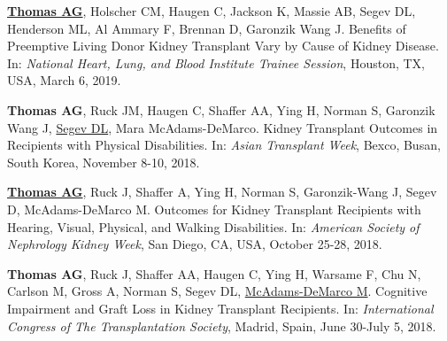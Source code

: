 \documentclass[10pt]{article}
\makeatletter
\newlength{\bibhang}
\newlength{\bibsep}
 {\@listi \global\bibsep\itemsep \global\advance\bibsep by\parsep}
\newenvironment{bibenum*}
  {\renewcommand\labelenumi{[\theenumi]}%
   \etaremune[
     topsep=0pt,
     itemsep=\bibsep,
     parsep=0pt,partopsep=0pt,
     itemindent=-\bibhang,
     leftmargin={\bibhang+\widthof{[999]}}]}
  {\endetaremune}
\makeatother
\begin{document}
\begin{bibenum*}
\item \underline{\textbf{Thomas AG}}, Holscher CM, Haugen C,
  Jackson K, Massie AB,
  Segev DL, Henderson ML, Al Ammary F, Brennan D, Garonzik Wang J.
  Benefits of Preemptive Living Donor Kidney Transplant Vary by
  Cause of Kidney Disease.
  In: \emph{National Heart, Lung, and Blood Institute Trainee Session},
  Houston, TX, USA, March 6, 2019.

\item \textbf{Thomas AG}, Ruck JM, Haugen C, Shaffer AA, Ying H,
  Norman S, Garonzik Wang J, \underline{Segev DL}, Mara McAdams-DeMarco.
  Kidney Transplant Outcomes in Recipients with Physical Disabilities.
  In: \emph{Asian Transplant Week},
  Bexco, Busan, South Korea, November 8-10, 2018.

\item \underline{\textbf{Thomas AG}}, Ruck J, Shaffer A, Ying H, Norman S,
  Garonzik-Wang J, Segev D, McAdams-DeMarco M.
  Outcomes for Kidney Transplant Recipients with Hearing, Visual, Physical,
  and Walking Disabilities.
  In: \emph{American Society of Nephrology Kidney Week},
  San Diego, CA, USA, October 25-28, 2018.


\item \textbf{Thomas AG}, Ruck J, Shaffer AA, Haugen C, Ying H,
  Warsame F, Chu N, Carlson M, Gross A, Norman S,
  Segev DL, \underline{McAdams-DeMarco M}.
  Cognitive Impairment and Graft Loss in Kidney Transplant Recipients.
  In: \emph{International Congress of The Transplantation Society},
  Madrid, Spain, June 30-July 5, 2018.




\end{bibenum*}
\end{document}
